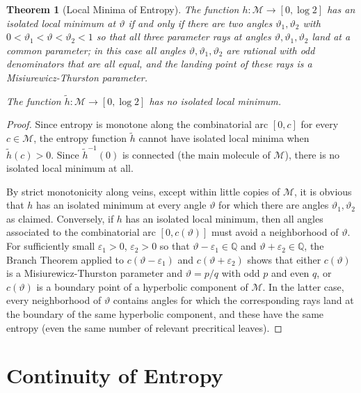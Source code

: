 \documentclass[12pt]{amsart}
\newcommand{\M}{\mathscr M}
\newcommand{\Q}{\mathbb Q}
\newcommand{\0}{\texttt{0}}
\newcommand{\1}{\texttt{1}}
\newcommand\eps{\varepsilon}
\newtheorem{theorem}{Theorem}[section]
\theoremstyle{definition}
\numberwithin{equation}{section}
\renewcommand{\theta}{\vartheta}
\newcounter{reminder}[section]
\newcounter{treminder}
\newcommand{\reminder}[1]{\stepcounter{reminder}\stepcounter{treminder}$\rhd$\textsl{#1}$\lhd$\marginpar{\thesection.\arabic{reminder}$\lhd\rhd\lhd\rhd\lhd\rhd$}}
\renewcommand{\reminder}[1]{}
\begin{document}
\begin{theorem}[Local Minima of Entropy]
The function $h\colon\M\to[0,\log 2]$ has an isolated local minimum at $\theta$ if and only if there are two angles $\theta_1,\theta_2$ with $0<\theta_1<\theta<\theta_2<1$ so that all three parameter rays at angles $\theta,\theta_1,\theta_2$ land at a common parameter; in this case all angles $\theta,\theta_1,\theta_2$ are rational with odd denominators that are all equal, and the landing point of these rays is a Misiurewicz-Thurston parameter.

The function $\tilde h\colon\M\to[0,\log 2]$ has no isolated local minimum.
\end{theorem}

\begin{proof}
Since entropy is monotone along the combinatorial arc $[0,c]$ for every $c\in\M$, the entropy function $\tilde h$ cannot have isolated local minima when $\tilde h(c)>0$. Since $\tilde h^{-1}(0)$ is connected (the main molecule of $\M$), there is no isolated local minimum at all. 


By strict monotonicity along veins, except within little copies of $\M$, it is obvious that $h$ has an isolated minimum at every angle $\theta$ for which there are angles $\theta_1,\theta_2$ as claimed. Conversely, if $h$ has an isolated local minimum, then all angles associated to the combinatorial arc $[0,c(\theta)]$ must avoid a neighborhood of $\theta$.
For sufficiently small $\eps_1>0$, $\eps_2>0$ so that $\theta-\eps_1\in\Q$ and $\theta+\eps_2\in\Q$, the Branch Theorem applied to $c(\theta-\eps_1)$ and $c(\theta+\eps_2)$ shows that either $c(\theta)$ is a Misiurewicz-Thurston parameter and $\theta=p/q$ with odd $p$ and even $q$, or $c(\theta)$ is a boundary point of a hyperbolic component of $\M$. In the latter case, every neighborhood of $\theta$ contains angles for which the corresponding rays land at the boundary of the same hyperbolic component, and these have the same entropy (even the same number of relevant precritical leaves).
\end{proof}

\reminder{Should we also discuss non-isolated local minima? These occur at little Mandelbrot sets, but this would require the statement that entropy is constant within every little Mandelbrot set that has positive entropy at the root.}



\section{Continuity of Entropy}
\label{Sec:Continuity}
\end{document}
